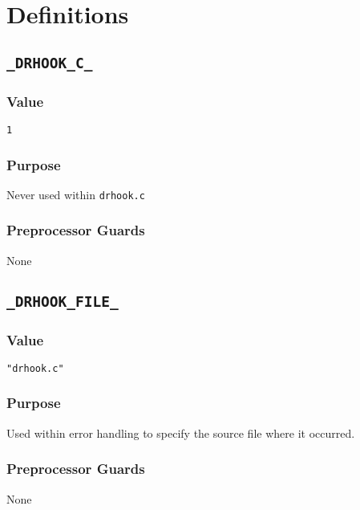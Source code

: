 \section{Definitions}

\subsection{\texttt{\_DRHOOK\_C\_}}
\vspace{-2ex}
\subsubsection{Value}
\vspace{-2ex}
\texttt{1}

\vspace{-2ex}
\subsubsection{Purpose}
\vspace{-2ex}
 Never used within \texttt{drhook.c}

\vspace{-2ex}
\subsubsection{Preprocessor Guards}
\vspace{-2ex}
None


\subsection{\texttt{\_DRHOOK\_FILE\_}}
\vspace{-2ex}
\subsubsection{Value}
\vspace{-2ex}
\texttt{"drhook.c"}

\vspace{-2ex}
\subsubsection{Purpose}
\vspace{-2ex}
Used within error handling to specify the source file where it occurred.

\vspace{-2ex}
\subsubsection{Preprocessor Guards}
\vspace{-2ex}
None

